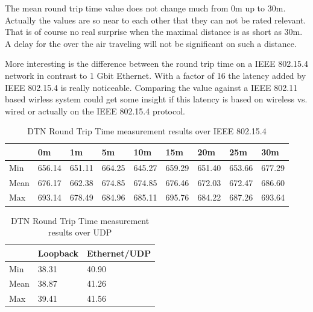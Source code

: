 The mean round trip time value does not change much from 0m up to 30m. Actually
the values are so near to each other that they can not be rated relevant. That
is of course no real surprise when the maximal distance is as short as 30m. A
delay for the over the air traveling will not be significant on such a distance.

More interesting is the difference between the round trip time on a IEEE
802.15.4 network in contrast to 1 Gbit Ethernet. With a factor of 16 the latency
added by IEEE 802.15.4 is really noticeable. Comparing the value against a
IEEE 802.11 based wirless system could get some insight if this latency is based
on wireless vs. wired or actually on the IEEE 802.15.4 protocol.

\begin{table}
\begin{tabular}{lllllllll}
    & 0m & 1m & 5m & 10m & 15m & 20m & 25m & 30m \\
\hline
Min & 656.14 & 651.11 & 664.25 & 645.27 & 659.29 & 651.40 & 653.66 & 677.29 \\
Mean & 676.17 & 662.38 & 674.85 & 674.85 & 676.46 & 672.03 & 672.47 & 686.60 \\
Max & 693.14 & 678.49 & 684.96 & 685.11 & 695.76 & 684.22 & 687.26 & 693.64 \\
\end{tabular}
\caption{DTN Round Trip Time measurement results over IEEE 802.15.4}
\label{dtnrtt}
\end{table}

\begin{table}
\begin{tabular}{lll}
    & Loopback & Ethernet/UDP \\
\hline
Min & 38.31 & 40.90 \\
Mean & 38.87 & 41.26 \\
Max & 39.41 & 41.56 \\
\end{tabular}
\caption{DTN Round Trip Time measurement results over UDP}
\label{dtnrtt2}
\end{table}
